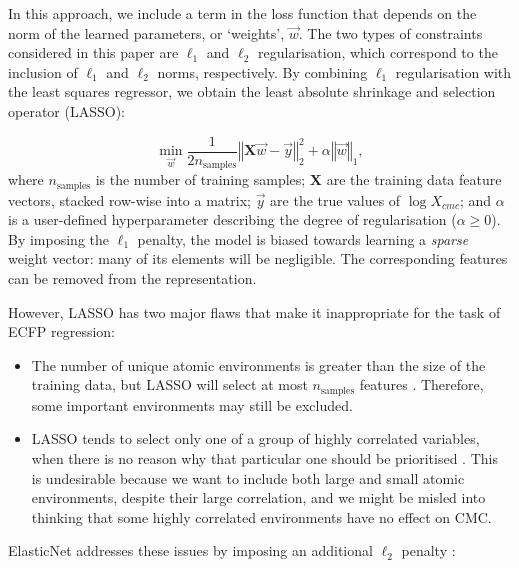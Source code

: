 In this approach, we include a term in the loss function that depends on the
norm of the learned parameters, or `weights', $\vec{w}$. The two types of constraints
considered in this paper are $\ell_1$ and $\ell_2$ regularisation, which correspond to
the inclusion of $\ell_1$ and $\ell_2$ norms, respectively. By combining $\ell_1$
regularisation with the least squares regressor, we obtain the least absolute
shrinkage and selection operator (LASSO)\cite{tibshiraniRegressionShrinkageSelection1996}:

\begin{equation}
    \min_{\vec{w}} { \frac{1}{2n_{\text{samples}}} \left \Vert \mathbf{X}\vec{w} - \vec{y} \right \Vert_2 ^ 2 + \alpha \left \Vert \vec{w} \right \Vert_1},
\end{equation}
where $n_{\text{samples}}$ is the number of training samples; $\mathbf{X}$ are
the training data feature vectors, stacked row-wise into a matrix; $\vec{y}$ are
the true values of $\log X_{cmc}$; and $\alpha$ is a user-defined hyperparameter
describing the degree of regularisation ($\alpha \geq 0$). By imposing the $\ell_1$ penalty, the
model is biased towards learning a \emph{sparse} weight vector: many of its
elements will be negligible. The corresponding features can be removed from the
representation.

However, LASSO has two major flaws that make it inappropriate for the task of
ECFP regression:

\begin{itemize}
    \item The number of unique atomic environments is greater than the size of
    the training data, but LASSO will select at most $n_\text{samples}$ features
    \cite{efronLeastAngleRegression2004}. Therefore, some important environments
    may still be excluded.
    \item LASSO tends to select only one of a group of highly correlated
    variables, when there is no reason why that particular one should be
    prioritised \cite{zouRegularizationVariableSelection2005}. This is
    undesirable because we want to include both large and small atomic
    environments, despite their large correlation, and we might be misled into
    thinking that some highly correlated environments have no effect on CMC.
\end{itemize}

ElasticNet addresses these issues by imposing an additional $\ell_2$ penalty \cite{zouRegularizationVariableSelection2005}:

